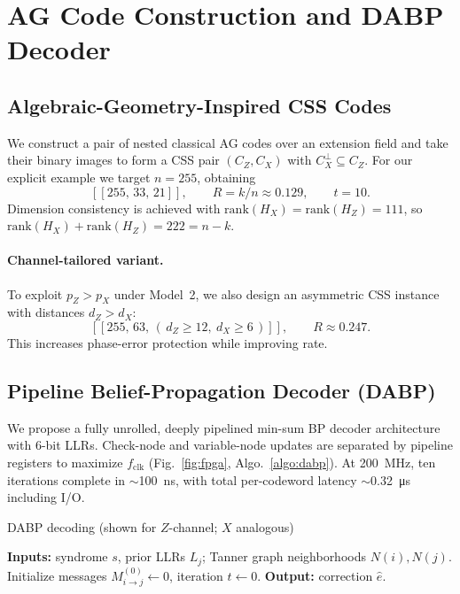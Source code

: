 \section{AG Code Construction and DABP Decoder}\label{sec:code_decoder}

\subsection{Algebraic-Geometry-Inspired CSS Codes}
We construct a pair of nested classical AG codes over an extension field and take their binary images to form a CSS pair \((C_Z,C_X)\) with \(C_X^\perp \subseteq C_Z\). For our explicit example we target \(n=255\), obtaining
\[
  [[255,\,33,\,21]] ,\qquad R=k/n\approx 0.129,\qquad t=10.
\]
Dimension consistency is achieved with \(\mathrm{rank}(H_X)=\mathrm{rank}(H_Z)=111\), so \(\mathrm{rank}(H_X)+\mathrm{rank}(H_Z)=222=n-k\).

\paragraph*{Channel-tailored variant.}\label{sec:channel-tailored}
To exploit \(p_Z\!>\!p_X\) under Model~2, we also design an asymmetric CSS instance with distances \(d_Z>d_X\):
\[
  [[255,\,63,\,(\,d_Z\!\ge 12,\ d_X\!\ge 6\,)]] ,\qquad R\approx 0.247 .
\]
This increases phase-error protection while improving rate.

\subsection{Pipeline Belief-Propagation Decoder (DABP)}\label{sec:implementation}
We propose a fully unrolled, deeply pipelined min-sum BP decoder architecture with 6-bit LLRs. Check-node and variable-node updates are separated by pipeline registers to maximize \(f_\mathrm{clk}\) (Fig.~\ref{fig:fpga}, Algo.~\ref{algo:dabp}). At \SI{200}{\mega\hertz}, ten iterations complete in \(\sim\)\SI{100}{\nano\second}, with total per-codeword latency \(\sim\)\SI{0.32}{\micro\second} including I/O.

\begin{algorithm}[t]
\DontPrintSemicolon
\caption{DABP decoding (shown for \(Z\)-channel; \(X\) analogous)}\label{algo:dabp}
\textbf{Inputs:} syndrome \(s\), prior LLRs \(L_j\); Tanner graph neighborhoods \(N(i),N(j)\).\\
Initialize messages \(M_{i\to j}^{(0)}\gets 0\), iteration \(t\gets0\).\;
\textbf{Output:} correction \(\hat e\).\;
\end{algorithm}

